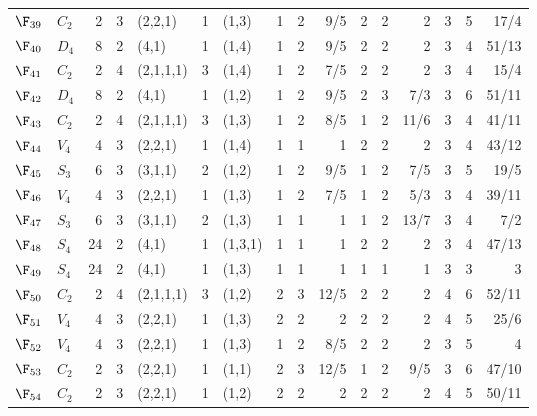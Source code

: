 \begin{landscape}
{\begin{longtable}{@{}l l r r l r l rrr rrr rrr@{}}
\addlinespace[3pt]
\textbf{$\F_{39}$} & $C_{2}$ & 2 & 3 & (2,2,1) & 1 & (1,3) & 1 & 2 & 9/5 & 2 & 2 & 2 & 3 & 5 & 17/4 \\
\addlinespace[3pt]
\textbf{$\F_{40}$} & $D_{4}$ & 8 & 2 & (4,1) & 1 & (1,4) & 1 & 2 & 9/5 & 2 & 2 & 2 & 3 & 4 & 51/13 \\
\addlinespace[3pt]
\textbf{$\F_{41}$} & $C_{2}$ & 2 & 4 & (2,1,1,1) & 3 & (1,4) & 1 & 2 & 7/5 & 2 & 2 & 2 & 3 & 4 & 15/4 \\
\addlinespace[3pt]
\textbf{$\F_{42}$} & $D_{4}$ & 8 & 2 & (4,1) & 1 & (1,2) & 1 & 2 & 9/5 & 2 & 3 & 7/3 & 3 & 6 & 51/11 \\
\addlinespace[3pt]
\textbf{$\F_{43}$} & $C_{2}$ & 2 & 4 & (2,1,1,1) & 3 & (1,3) & 1 & 2 & 8/5 & 1 & 2 & 11/6 & 3 & 4 & 41/11 \\
\addlinespace[3pt]
\textbf{$\F_{44}$} & $V_{4}$ & 4 & 3 & (2,2,1) & 1 & (1,4) & 1 & 1 & 1 & 2 & 2 & 2 & 3 & 4 & 43/12 \\
\addlinespace[3pt]
\textbf{$\F_{45}$} & $S_{3}$ & 6 & 3 & (3,1,1) & 2 & (1,2) & 1 & 2 & 9/5 & 1 & 2 & 7/5 & 3 & 5 & 19/5 \\
\addlinespace[3pt]
\textbf{$\F_{46}$} & $V_{4}$ & 4 & 3 & (2,2,1) & 1 & (1,3) & 1 & 2 & 7/5 & 1 & 2 & 5/3 & 3 & 4 & 39/11 \\
\addlinespace[3pt]
\textbf{$\F_{47}$} & $S_{3}$ & 6 & 3 & (3,1,1) & 2 & (1,3) & 1 & 1 & 1 & 1 & 2 & 13/7 & 3 & 4 & 7/2 \\
\addlinespace[3pt]
\textbf{$\F_{48}$} & $S_{4}$ & 24 & 2 & (4,1) & 1 & (1,3,1) & 1 & 1 & 1 & 2 & 2 & 2 & 3 & 4 & 47/13 \\
\addlinespace[3pt]
\textbf{$\F_{49}$} & $S_{4}$ & 24 & 2 & (4,1) & 1 & (1,3) & 1 & 1 & 1 & 1 & 1 & 1 & 3 & 3 & 3 \\
\addlinespace[3pt]
\textbf{$\F_{50}$} & $C_{2}$ & 2 & 4 & (2,1,1,1) & 3 & (1,2) & 2 & 3 & 12/5 & 2 & 2 & 2 & 4 & 6 & 52/11 \\
\addlinespace[3pt]
\textbf{$\F_{51}$} & $V_{4}$ & 4 & 3 & (2,2,1) & 1 & (1,3) & 2 & 2 & 2 & 2 & 2 & 2 & 4 & 5 & 25/6 \\
\addlinespace[3pt]
\textbf{$\F_{52}$} & $V_{4}$ & 4 & 3 & (2,2,1) & 1 & (1,3) & 1 & 2 & 8/5 & 2 & 2 & 2 & 3 & 5 & 4 \\
\addlinespace[3pt]
\textbf{$\F_{53}$} & $C_{2}$ & 2 & 3 & (2,2,1) & 1 & (1,1) & 2 & 3 & 12/5 & 1 & 2 & 9/5 & 3 & 6 & 47/10 \\
\addlinespace[3pt]
\textbf{$\F_{54}$} & $C_{2}$ & 2 & 3 & (2,2,1) & 1 & (1,2) & 2 & 2 & 2 & 2 & 2 & 2 & 4 & 5 & 50/11 \\

\end{longtable}}
\end{landscape}
